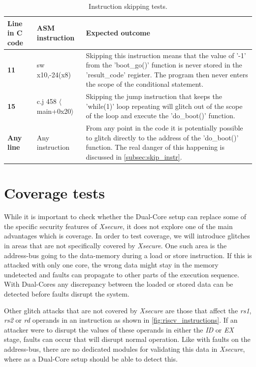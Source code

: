 \begin{table}[h]
\centering
\caption{Instruction skipping tests.}
\label{tab:instr_skip_test}
\begin{tabular}{m{2.5cm}m{3.5cm}m{7.5cm}}
\toprule 
Line in C code & ASM instruction & Expected outcome \\
\midrule
\rowcolor{black!20} \textbf{11} & sw x10,-24(x8) & Skipping this instruction means that the value of '-1' from the 'boot\_go()' function is never stored in the 'result\_code' register. The program then never enters the scope of the conditional statement. \\
\textbf{15} & c.j 458 $\langle$main+0x20$\rangle$ & Skipping the jump instruction that keeps the 'while(1)' loop repeating will glitch out of the scope of the loop and execute the 'do\_boot()' function.  \\
\rowcolor{black!20} \textbf{Any line} & Any instruction & From any point in the code it is potentially possible to glitch directly to the address of the 'do\_boot()' function. The real danger of this happening is discussed in \autoref{subsec:skip_instr}. \\
\bottomrule
\end{tabular}
\end{table}

\section{Coverage tests}
\label{sec:coverage_test}

While it is important to check whether the Dual-Core setup can replace some of the specific security features of \textit{Xsecure}, it does not explore one of the main advantages which is coverage. In order to test coverage, we will introduce glitches in areas that are not specifically covered by \textit{Xsecure}. One such area is the address-bus going to the data-memory during a load or store instruction. If this is attacked with only one core, the wrong data might stay in the memory undetected and faults can propagate to other parts of the execution sequence. With Dual-Cores any discrepancy between the loaded or stored data can be detected before faults disrupt the system. 

Other glitch attacks that are not covered by \textit{Xsecure} are those that affect the \textit{rs1}, \textit{rs2} or \textit{rd} operands in an instruction as shown in \autoref{fig:riscv_instructions}. If an attacker were to disrupt the values of these operands in either the \textit{ID} or \textit{EX} stage, faults can occur that will disrupt normal operation. Like with faults on the address-bus, there are no dedicated modules for validating this data in \textit{Xsecure}, where as a Dual-Core setup should be able to detect this.

